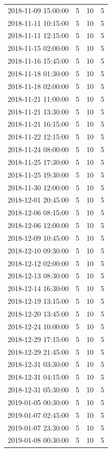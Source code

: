 \begin{tabular}{lrrr}
2018-11-09 15:00:00 & 5 & 10 & 5 \\
2018-11-11 10:15:00 & 5 & 10 & 5 \\
2018-11-11 12:15:00 & 5 & 10 & 5 \\
2018-11-15 02:00:00 & 5 & 10 & 5 \\
2018-11-16 15:45:00 & 5 & 10 & 5 \\
2018-11-18 01:30:00 & 5 & 10 & 5 \\
2018-11-18 02:00:00 & 5 & 10 & 5 \\
2018-11-21 11:00:00 & 5 & 10 & 5 \\
2018-11-21 13:30:00 & 5 & 10 & 5 \\
2018-11-21 16:15:00 & 5 & 10 & 5 \\
2018-11-22 12:15:00 & 5 & 10 & 5 \\
2018-11-24 08:00:00 & 5 & 10 & 5 \\
2018-11-25 17:30:00 & 5 & 10 & 5 \\
2018-11-25 19:30:00 & 5 & 10 & 5 \\
2018-11-30 12:00:00 & 5 & 10 & 5 \\
2018-12-01 20:45:00 & 5 & 10 & 5 \\
2018-12-06 08:15:00 & 5 & 10 & 5 \\
2018-12-06 12:00:00 & 5 & 10 & 5 \\
2018-12-09 10:45:00 & 5 & 10 & 5 \\
2018-12-10 09:30:00 & 5 & 10 & 5 \\
2018-12-12 02:00:00 & 5 & 10 & 5 \\
2018-12-13 08:30:00 & 5 & 10 & 5 \\
2018-12-14 16:30:00 & 5 & 10 & 5 \\
2018-12-19 13:15:00 & 5 & 10 & 5 \\
2018-12-20 13:45:00 & 5 & 10 & 5 \\
2018-12-24 10:00:00 & 5 & 10 & 5 \\
2018-12-29 17:15:00 & 5 & 10 & 5 \\
2018-12-29 21:45:00 & 5 & 10 & 5 \\
2018-12-31 03:30:00 & 5 & 10 & 5 \\
2018-12-31 04:15:00 & 5 & 10 & 5 \\
2018-12-31 05:30:00 & 5 & 10 & 5 \\
2019-01-05 00:30:00 & 5 & 10 & 5 \\
2019-01-07 02:45:00 & 5 & 10 & 5 \\
2019-01-07 23:30:00 & 5 & 10 & 5 \\
2019-01-08 00:30:00 & 5 & 10 & 5 \\

\end{tabular}
